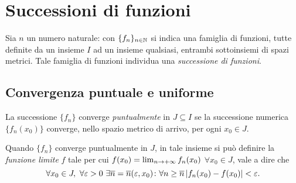 \chapter{Successioni di funzioni}
Sia $n$ un numero naturale: con $\{f_n\}_{n\in\mathbb{N}}$ si indica una famiglia di funzioni, tutte definite da un insieme $I$ ad un insieme qualsiasi, entrambi sottoinsiemi di spazi metrici. Tale famiglia di funzioni individua una \emph{successione di funzioni}.
\section{Convergenza puntuale e uniforme}
\begin{definizione} \label{d:conv_puntuale_succ}
La successione $\{f_n\}$ converge \emph{puntualmente} in $J\subseteq I$ se la successione numerica $\{f_n(x_0)\}$ converge, nello spazio metrico di arrivo, per ogni $x_0\in J$.
\end{definizione}
Quando $\{f_n\}$ converge puntualmente in $J$, in tale insieme si può definire la \emph{funzione limite} $f$ tale per cui $f(x_0)=\lim_{n\to+\infty}f_n(x_0)$ $\forall x_0\in J$, vale a dire che
\begin{equation} \label{eq:conv_puntuale_succ}
\forall x_0\in J,\ \forall\epsilon>0\ \exists\overline{n}=\overline{n}(\epsilon,x_0)\colon\forall n\geq\overline{n}\abs{f_n(x_0)-f(x_0)}<\epsilon.
\end{equation}
